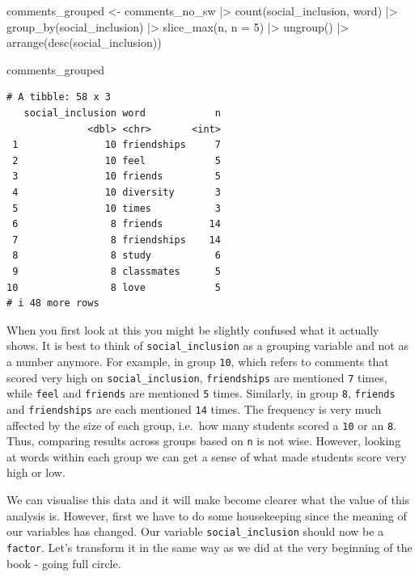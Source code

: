 \documentclass[
  letterpaper,
]{krantz}
\makeatletter
\newenvironment{Shaded}{\begin{snugshade}}{\end{snugshade}}
\newcommand{\AttributeTok}[1]{\textcolor[rgb]{0.40,0.45,0.13}{#1}}
\newcommand{\DecValTok}[1]{\textcolor[rgb]{0.68,0.00,0.00}{#1}}
\newcommand{\FunctionTok}[1]{\textcolor[rgb]{0.28,0.35,0.67}{#1}}
\newcommand{\NormalTok}[1]{\textcolor[rgb]{0.00,0.23,0.31}{#1}}
\newcommand{\OtherTok}[1]{\textcolor[rgb]{0.00,0.23,0.31}{#1}}
\newcommand{\SpecialCharTok}[1]{\textcolor[rgb]{0.37,0.37,0.37}{#1}}
\newenvironment{kframe}{%
\medskip{}
\setlength{\fboxsep}{.8em}
 \def\at@end@of@kframe{}%
 \ifinner\ifhmode%
  \def\at@end@of@kframe{\end{minipage}}%
  \begin{minipage}{\columnwidth}%
 \fi\fi%
 \def\FrameCommand##1{\hskip\@totalleftmargin \hskip-\fboxsep
 \colorbox{shadecolor}{##1}\hskip-\fboxsep
     \hskip-\linewidth \hskip-\@totalleftmargin \hskip\columnwidth}%
 \MakeFramed {\advance\hsize-\width
   \@totalleftmargin\z@ \linewidth\hsize
   \@setminipage}}%
 {\par\unskip\endMakeFramed%
 \at@end@of@kframe}
\renewenvironment{Shaded}{\begin{kframe}}{\end{kframe}}
\makeatother
\begin{document}
\begin{Shaded}
\begin{Highlighting}[]
\NormalTok{comments\_grouped }\OtherTok{\textless{}{-}}
\NormalTok{  comments\_no\_sw }\SpecialCharTok{|\textgreater{}}
  \FunctionTok{count}\NormalTok{(social\_inclusion, word) }\SpecialCharTok{|\textgreater{}}
  \FunctionTok{group\_by}\NormalTok{(social\_inclusion) }\SpecialCharTok{|\textgreater{}}
  \FunctionTok{slice\_max}\NormalTok{(n, }\AttributeTok{n =} \DecValTok{5}\NormalTok{) }\SpecialCharTok{|\textgreater{}}
  \FunctionTok{ungroup}\NormalTok{() }\SpecialCharTok{|\textgreater{}}
  \FunctionTok{arrange}\NormalTok{(}\FunctionTok{desc}\NormalTok{(social\_inclusion))}

\NormalTok{comments\_grouped}
\end{Highlighting}
\end{Shaded}

\begin{verbatim}
# A tibble: 58 x 3
   social_inclusion word            n
              <dbl> <chr>       <int>
 1               10 friendships     7
 2               10 feel            5
 3               10 friends         5
 4               10 diversity       3
 5               10 times           3
 6                8 friends        14
 7                8 friendships    14
 8                8 study           6
 9                8 classmates      5
10                8 love            5
# i 48 more rows
\end{verbatim}

When you first look at this you might be slightly confused what it
actually shows. It is best to think of \texttt{social\_inclusion} as a
grouping variable and not as a number anymore. For example, in group
\texttt{10}, which refers to comments that scored very high on
\texttt{social\_inclusion}, \texttt{friendships} are mentioned
\texttt{7} times, while \texttt{feel} and \texttt{friends} are mentioned
\texttt{5} times. Similarly, in group \texttt{8}, \texttt{friends} and
\texttt{friendships} are each mentioned \texttt{14} times. The frequency
is very much affected by the size of each group, i.e.~how many students
scored a \texttt{10} or an \texttt{8}. Thus, comparing results across
groups based on \texttt{n} is not wise. However, looking at words within
each group we can get a sense of what made students score very high or
low.

We can visualise this data and it will make become clearer what the
value of this analysis is. However, first we have to do some
housekeeping since the meaning of our variables has changed. Our
variable \texttt{social\_inclusion} should now be a \texttt{factor}.
Let's transform it in the same way as we did at the very beginning of
the book - going full circle.
\end{document}
